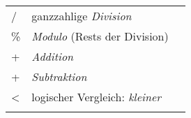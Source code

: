 \begin{longtable}[c]{@{}lll@{}}
\begin{minipage}[t]{0.08\columnwidth}\raggedright
/
\end{minipage} & \begin{minipage}[t]{0.77\columnwidth}\raggedright
ganzzahlige \emph{Division}
\end{minipage} & \begin{minipage}[t]{0.15\columnwidth}\raggedright
\end{minipage}
\\\noalign{\medskip}
\begin{minipage}[t]{0.08\columnwidth}\raggedright
\%
\end{minipage} & \begin{minipage}[t]{0.77\columnwidth}\raggedright
\emph{Modulo} (Rests der Division)
\end{minipage} & \begin{minipage}[t]{0.15\columnwidth}\raggedright
\end{minipage}
\\\noalign{\medskip}
\begin{minipage}[t]{0.08\columnwidth}\raggedright
+
\end{minipage} & \begin{minipage}[t]{0.77\columnwidth}\raggedright
\emph{Addition}
\end{minipage} & \begin{minipage}[t]{0.15\columnwidth}\raggedright
\end{minipage}
\\\noalign{\medskip}
\begin{minipage}[t]{0.08\columnwidth}\raggedright
+
\end{minipage} & \begin{minipage}[t]{0.77\columnwidth}\raggedright
\emph{Subtraktion}
\end{minipage} & \begin{minipage}[t]{0.15\columnwidth}\raggedright
\end{minipage}
\\\noalign{\medskip}
\begin{minipage}[t]{0.08\columnwidth}\raggedright
\textless{}
\end{minipage} & \begin{minipage}[t]{0.77\columnwidth}\raggedright
logischer Vergleich: \emph{kleiner}
\end{minipage} & \begin{minipage}[t]{0.15\columnwidth}\raggedright
\end{minipage}
\\\noalign{\medskip}

\end{longtable}
